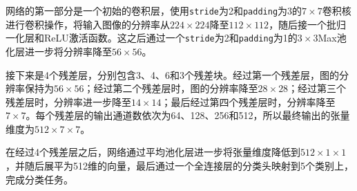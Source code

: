 \documentclass[11pt]{article}
\begin{document}
	网络的第一部分是一个初始的卷积层，使用\lstinline|stride|为2和\lstinline|padding|为3的$7\times 7$卷积核进行卷积操作，将输入图像的分辨率从$224\times 224$降至$112\times 112$，随后接一个批归一化层和ReLU激活函数。这之后通过一个\lstinline|stride|为2和\lstinline|padding|为1的$3\times 3$Max池化层进一步将分辨率降至$56\times 56$。

	接下来是4个残差层，分别包含3、4、6和3个残差块。经过第一个残差层，图的分辨率保持为$56\times 56$；经过第二个残差层时，图的分辨率降至$28\times 28$；经过第三个残差层时，分辨率进一步降至$14\times 14$；最后经过第四个残差层时，分辨率降至$7\times 7$。每个残差层的输出通道数依次为64、128、256和512，所以最终输出的张量维度为$512\times 7\times 7$。
	
	在经过4个残差层之后，网络通过平均池化层进一步将张量维度降低到$512\times 1\times 1$，并随后展平为512维的向量，最后通过一个全连接层的分类头映射到5个类别上，完成分类任务。
\end{document}
